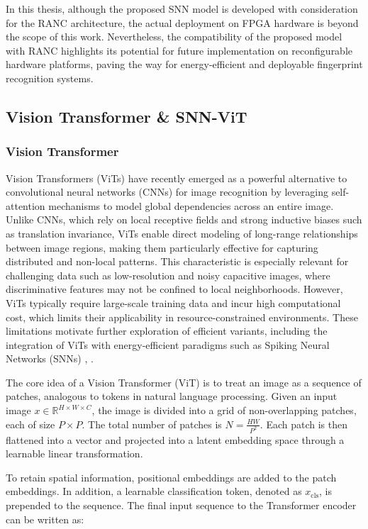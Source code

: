 \documentclass[../main.tex]{subfiles}
\begin{document}
In this thesis, although the proposed SNN model is developed with consideration for the RANC\cite{RANC} architecture, the actual deployment on FPGA hardware is beyond the scope of this work. Nevertheless, the compatibility of the proposed model with RANC\cite{RANC} highlights its potential for future implementation on reconfigurable hardware platforms, paving the way for energy-efficient and deployable fingerprint recognition systems.

\subsection{Vision Transformer \& SNN-ViT}
\subsubsection{Vision Transformer}
Vision Transformers (ViTs) have recently emerged as a powerful alternative to convolutional neural networks (CNNs) for image recognition by leveraging self-attention mechanisms to model global dependencies across an entire image. Unlike CNNs, which rely on local receptive fields and strong inductive biases such as translation invariance, ViTs enable direct modeling of long-range relationships between image regions, making them particularly effective for capturing distributed and non-local patterns. This characteristic is especially relevant for challenging data such as low-resolution and noisy capacitive images, where discriminative features may not be confined to local neighborhoods. However, ViTs typically require large-scale training data and incur high computational cost, which limits their applicability in resource-constrained environments. These limitations motivate further exploration of efficient variants, including the integration of ViTs with energy-efficient paradigms such as Spiking Neural Networks (SNNs) \cite{dosovitskiy2021imageworth16x16words}, \cite{touvron2021trainingdataefficientimagetransformers}.

The core idea of a Vision Transformer (ViT) is to treat an image as a sequence of patches, analogous to tokens in natural language processing. Given an input image $x \in \mathbb{R}^{H \times W \times C}$, the image is divided into a grid of non-overlapping patches, each of size $P \times P$. The total number of patches is $N = \frac{HW}{P^2}$. Each patch is then flattened into a vector and projected into a latent embedding space through a learnable linear transformation.

To retain spatial information, positional embeddings are added to the patch embeddings. In addition, a learnable classification token, denoted as $x_{\text{cls}}$, is prepended to the sequence. The final input sequence to the Transformer encoder can be written as:
\end{document}
